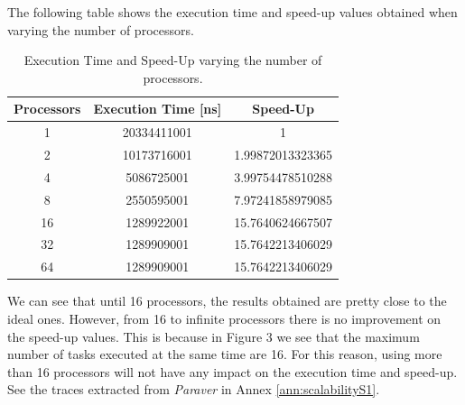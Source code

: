 \documentclass[12pt, a4paper]{article}
\begin{document}
The following table shows the execution time and speed-up values obtained when varying the number of processors.

\begin{table}[H]
\centering
\begin{tabular}{ |c|c|c| } 
 \hline
 \textbf{Processors} & \textbf{Execution Time [ns]} & \textbf{Speed-Up} \\ 
 \hline
 \hline
	1	& 20334411001	& 1 \\
	 \hline
	2	& 10173716001	& 1.99872013323365 \\
	 \hline
	4	& 5086725001	& 3.99754478510288 \\
	 \hline
	8	& 2550595001	& 7.97241858979085 \\
	 \hline
	16	& 1289922001	& 15.7640624667507 \\
	 \hline
	32	& 1289909001	& 15.7642213406029 \\
	 \hline
	64	& 1289909001	& 15.7642213406029 \\
 \hline
\end{tabular}
 
 \label{tab:Scalability_S1}
\caption{Execution Time and Speed-Up varying the number of processors.}
\end{table}

We can see that until 16 processors, the results obtained are pretty close to the ideal ones. However, from 16 to infinite processors there is no improvement on the speed-up values. This is because in Figure 3 we see that the maximum number of tasks executed at the same time are 16. For this reason, using more than 16 processors will not have any impact on the execution time and speed-up. See the traces extracted from \textit{Paraver} in Annex \ref{ann:scalabilityS1}.
\end{document}
